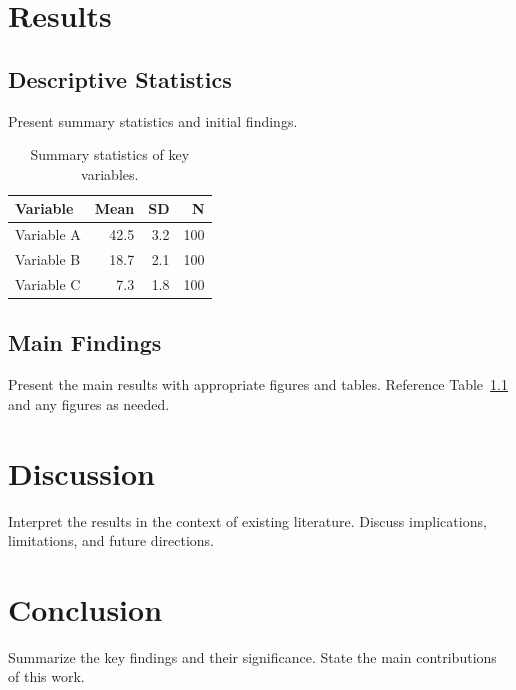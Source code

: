 \documentclass[11pt]{report}
\begin{document}
\chapter{Results}

\section{Descriptive Statistics}

Present summary statistics and initial findings.

\begin{table}[H]
\centering
\caption{Summary statistics of key variables.}
\label{tab:summary}
\begin{tabular}{lrrr}
\toprule
\textbf{Variable} & \textbf{Mean} & \textbf{SD} & \textbf{N} \\
\midrule
Variable A & \num{42.5} & \num{3.2} & 100 \\
Variable B & \num{18.7} & \num{2.1} & 100 \\
Variable C & \num{7.3}  & \num{1.8} & 100 \\
\bottomrule
\end{tabular}
\end{table}

\section{Main Findings}

Present the main results with appropriate figures and tables. Reference Table~\ref{tab:summary} and any figures as needed.

\chapter{Discussion}

Interpret the results in the context of existing literature. Discuss implications, limitations, and future directions.

\chapter{Conclusion}

Summarize the key findings and their significance. State the main contributions of this work.



\end{document}

